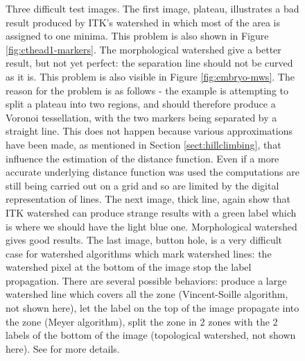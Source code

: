 \documentclass{InsightArticle}
\begin{document}
\begin{figure}[htbp]
\begin{center}
\caption{Three difficult test images. The first image, plateau, illustrates a 
bad result produced by ITK's watershed in which most of the area is
assigned to one minima. This problem is also shown in Figure
\ref{fig:cthead1-markers}. The morphological watershed give a better
result, but not yet perfect: the separation line should not be curved
as it is. This problem is also visible in Figure
\ref{fig:embryo-mws}. The reason for the problem is as follows - the 
example is attempting to split a plateau into two regions, and should
therefore produce a Voronoi tessellation, with the two markers being
separated by a straight line. This does not happen because various
approximations have been made, as mentioned in Section
\ref{sect:hillclimbing}, that influence the estimation of the distance
function. Even if a more accurate underlying distance function was
used the computations are still being carried out on a grid and so are
limited by the digital representation of lines.
The next image, thick line, again show that ITK watershed can produce
strange results with a green label which is where we should have the
light blue one. Morphological watershed gives good results. The last
image, button hole, is a very difficult case for watershed algorithms
which mark watershed lines: the watershed pixel at the bottom of the
image stop the label propagation. There are several possible
behaviors: produce a large watershed line which covers all the zone
(Vincent-Soille algorithm, not shown here), let the label on the top
of the image propagate into the zone (Meyer algorithm), split the zone
in 2 zones with the 2 labels of the bottom of the image (topological
watershed, not shown here). See \cite{najman03watershed} for more
details.\label{fig:difficult-cases}}
\end{center}
\end{figure}
\end{document}
